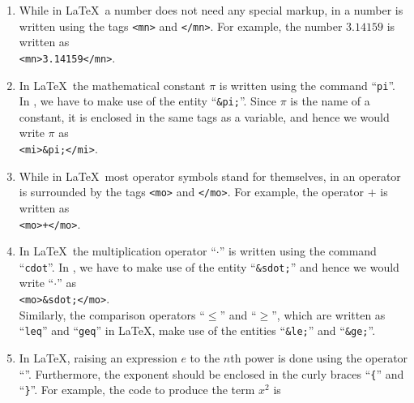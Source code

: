 \begin{enumerate}
      \texttt{<mi>} and \texttt{</mi>}.  For example, the mathematical variable $n$ is written as    
      \\[0.2cm]
      \hspace*{1.3cm}
      \texttt{<mi>n</mi>}.
\item While in \LaTeX\ a number does not need any special markup, in 
      a number is written using the tags 
      \texttt{<mn>} and \texttt{</mn>}.  For example, the number $3.14159$ is written as    
      \\[0.2cm]
      \hspace*{1.3cm}
      \texttt{<mn>3.14159</mn>}.
\item In \LaTeX\ the mathematical constant $\pi$ is written using the command ``\texttt{pi}''.
      In , we have to make use of the  entity ``\texttt{\&pi;}''.  Since
      $\pi$ is the name of a constant, it is enclosed in the same tags as a variable, and hence we would write
      $\pi$ as
      \\[0.2cm]
      \hspace*{1.3cm}
      \texttt{<mi>\&pi;</mi>}.
\item While in \LaTeX\ most operator symbols stand for themselves, in 
      an operator is surrounded by the tags 
      \texttt{<mo>} and \texttt{</mo>}.  For example, the operator $+$ is written as    
      \\[0.2cm]
      \hspace*{1.3cm}
      \texttt{<mo>+</mo>}.
\item In \LaTeX\ the multiplication operator ``$\cdot$'' is written using the command ``\texttt{cdot}''.
      In , we have to make use of the  entity ``\texttt{\&sdot;}'' and
      hence we would write ``$\cdot$'' as
      \\[0.2cm]
      \hspace*{1.3cm}
      \texttt{<mo>\&sdot;</mo>}.
      \\[0.2cm]
      Similarly, the comparison operators ``$\leq$'' and ``$\geq$'', which are written as
      ``\texttt{leq}'' and ``\texttt{geq}'' in \LaTeX, make use of the entities
      ``\texttt{\&le;}'' and ``\texttt{\&ge;}''.
\item In \LaTeX, raising an expression $e$ to the $n$th power is done using the operator
      ``\texttt{}''.  Furthermore, the exponent should be enclosed in the curly braces
      ``\texttt{\{}'' and ``\texttt{\}}''.  For example, the code to produce the term $x^2$ is

\end{enumerate}
